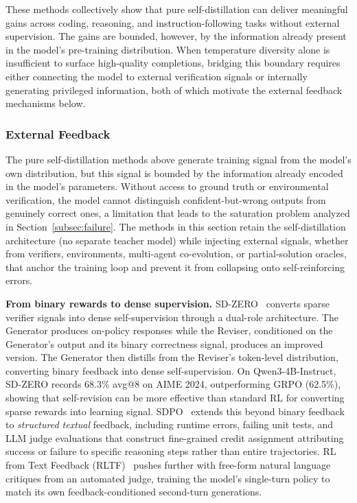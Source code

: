 \documentclass{article} %
\begin{document}
These methods collectively show that pure self-distillation can deliver meaningful gains across coding, reasoning, and instruction-following tasks without external supervision. The gains are bounded, however, by the information already present in the model's pre-training distribution. When temperature diversity alone is insufficient to surface high-quality completions, bridging this boundary requires either connecting the model to external verification signals or internally generating privileged information, both of which motivate the external feedback mechanisms below.

\subsubsection{External Feedback}
\label{subsec:external_feedback}

The pure self-distillation methods above generate training signal from the model's own distribution, but this signal is bounded by the information already encoded in the model's parameters. Without access to ground truth or environmental verification, the model cannot distinguish confident-but-wrong outputs from genuinely correct ones, a limitation that leads to the saturation problem analyzed in Section~\ref{subsec:failure}. The methods in this section retain the self-distillation architecture (no separate teacher model) while injecting external signals, whether from verifiers, environments, multi-agent co-evolution, or partial-solution oracles, that anchor the training loop and prevent it from collapsing onto self-reinforcing errors.

\textbf{From binary rewards to dense supervision.} SD-ZERO~\citep{2604.12002} converts sparse verifier signals into dense self-supervision through a dual-role architecture. The Generator produces on-policy responses while the Reviser, conditioned on the Generator's output and its binary correctness signal, produces an improved version. The Generator then distills from the Reviser's token-level distribution, converting binary feedback into dense self-supervision. On Qwen3-4B-Instruct, SD-ZERO records 68.3\% avg@8 on AIME 2024, outperforming GRPO (62.5\%), showing that self-revision can be more effective than standard RL for converting sparse rewards into learning signal. SDPO~\citep{2601.20802} extends this beyond binary feedback to \emph{structured textual} feedback, including runtime errors, failing unit tests, and LLM judge evaluations that construct fine-grained credit assignment attributing success or failure to specific reasoning steps rather than entire trajectories. RL from Text Feedback (RLTF)~\citep{2602.02482} pushes further with free-form natural language critiques from an automated judge, training the model's single-turn policy to match its own feedback-conditioned second-turn generations.
\end{document}
